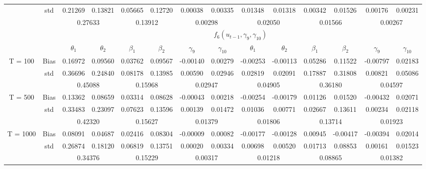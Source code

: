 \documentclass[a4paper,12pt,times,numbered,print,index]{report}
\numberwithin{equation}{section}
\begin{document}
\begin{table}[htbp]
\begin{adjustbox}{max width=\textwidth}
\begin{tabular}{cccccccccccccc}
		& std   & 0.21269 & 0.13821 & 0.05665 & 0.12720 & 0.00038 & 0.00335 & 0.01348 & 0.01318 & 0.00342 & 0.01526 & 0.00176 & 0.00231 \\
		&       & \multicolumn{2}{c}{0.27633} & \multicolumn{2}{c}{0.13912} & \multicolumn{2}{c}{0.00298} & \multicolumn{2}{c}{0.02050} & \multicolumn{2}{c}{0.01566} & \multicolumn{2}{c}{0.00267} \\
		\midrule
		&       & \multicolumn{12}{c}{$f_6 (u_{t-1}, \gamma_9, \gamma_{10})$} \\
		&       & $\theta_1$ & $\theta_2$ & $\beta_1$ & $\beta_2$ & $\gamma_9$ & $\gamma_{10}$ & $\theta_1$ & $\theta_2$ & $\beta_1$ & $\beta_2$ & $\gamma_9$ & $\gamma_{10}$ \\
		\midrule
		T = 100 & Bias  & 0.16972 & 0.09560 & 0.03762 & 0.09567 & -0.00140 & 0.00279 & -0.00253 & -0.00113 & 0.05286 & 0.11522 & -0.00797 & 0.02183 \\
		& std   & 0.36696 & 0.24840 & 0.08178 & 0.13985 & 0.00590 & 0.02946 & 0.02819 & 0.02091 & 0.17887 & 0.31808 & 0.00821 & 0.05086 \\
		&       & \multicolumn{2}{c}{\textcolor[rgb]{ .329,  .51,  .208}{0.45088}} & \multicolumn{2}{c}{0.15968} & \multicolumn{2}{c}{0.02947} & \multicolumn{2}{c}{\textcolor[rgb]{ .329,  .51,  .208}{0.04905}} & \multicolumn{2}{c}{0.36180} & \multicolumn{2}{c}{0.04597} \\
		\multirow{3}[0]{*}{T = 500} & Bias  & 0.13362 & 0.08659 & 0.03314 & 0.08628 & -0.00043 & 0.00218 & -0.00254 & -0.00179 & 0.01126 & 0.01520 & -0.00432 & 0.02071 \\
		& std   & 0.33483 & 0.23097 & 0.07623 & 0.13596 & 0.00139 & 0.01472 & 0.01036 & 0.00771 & 0.02667 & 0.13611 & 0.00234 & 0.02118 \\
		&       & \multicolumn{2}{c}{\textcolor[rgb]{ .329,  .51,  .208}{0.42320}} & \multicolumn{2}{c}{0.15627} & \multicolumn{2}{c}{0.01379} & \multicolumn{2}{c}{\textcolor[rgb]{ .329,  .51,  .208}{0.01806}} & \multicolumn{2}{c}{0.13714} & \multicolumn{2}{c}{0.01923} \\
		\multirow{3}[1]{*}{T = 1000} & Bias  & 0.08091 & 0.04687 & 0.02416 & 0.08304 & -0.00009 & 0.00082 & -0.00177 & -0.00128 & 0.00945 & -0.00417 & -0.00394 & 0.02014 \\
		& std   & 0.26874 & 0.18120 & 0.06819 & 0.13751 & 0.00020 & 0.00334 & 0.00698 & 0.00520 & 0.01713 & 0.08853 & 0.00161 & 0.01523 \\
		&       & \multicolumn{2}{c}{\textcolor[rgb]{ .329,  .51,  .208}{0.34376}} & \multicolumn{2}{c}{0.15229} & \multicolumn{2}{c}{0.00317} & \multicolumn{2}{c}{\textcolor[rgb]{ .329,  .51,  .208}{0.01218}} & \multicolumn{2}{c}{0.08865} & \multicolumn{2}{c}{0.01382} \\
		\bottomrule
		\bottomrule
    	\end{tabular}%
		\end{adjustbox}
\label{nonco-f56}%
\end{table}%
\end{document}
